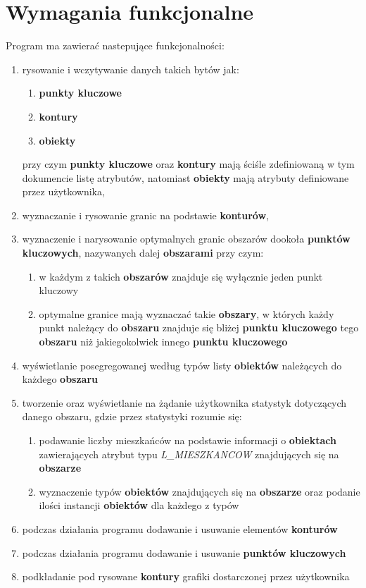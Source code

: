 \documentclass[hidelinks,10pt,a4paper]{article}
\newcommand\tab[1][0.5cm]{\hspace*{#1}}
\begin{document}
\section{Wymagania funkcjonalne}
\tab Program ma zawierać nastepujące funkcjonalności:
\begin{enumerate}


\item rysowanie i wczytywanie danych takich bytów jak:
\begin{enumerate}
\item \textbf{punkty kluczowe}
\item \textbf{kontury}
\item \textbf{obiekty}
\end{enumerate}
przy czym \textbf{punkty kluczowe} oraz \textbf{kontury} mają ściśle zdefiniowaną w tym dokumencie listę atrybutów, natomiast \textbf{obiekty} mają atrybuty definiowane przez użytkownika,
\item wyznaczanie i rysowanie granic na podstawie \textbf{konturów},
\item wyznaczenie i narysowanie optymalnych granic obszarów dookoła \textbf{punktów kluczowych}, nazywanych dalej \textbf{obszarami} przy czym:
\begin{enumerate}
\item w każdym z takich \textbf{obszarów} znajduje się wyłącznie jeden punkt kluczowy
\item optymalne granice mają wyznaczać takie \textbf{obszary}, w których każdy punkt należący do \textbf{obszaru} znajduje się bliżej \textbf{punktu kluczowego} tego \textbf{obszaru} niż jakiegokolwiek innego \textbf{punktu kluczowego}
\end{enumerate}
\item wyświetlanie posegregowanej według typów listy \textbf{obiektów} należących do każdego \textbf{obszaru}
\item tworzenie oraz wyświetlanie na żądanie użytkownika statystyk dotyczących danego obszaru, gdzie przez statystyki rozumie się:
\begin{enumerate}
\item podawanie liczby mieszkańców na podstawie informacji o \textbf{obiektach} zawierających atrybut typu \textit{L\_MIESZKANCOW} znajdujących się na \textbf{obszarze} 
\item wyznaczenie typów \textbf{obiektów} znajdujących się na \textbf{obszarze} oraz podanie ilości instancji \textbf{obiektów} dla każdego z typów
\end{enumerate}
\item podczas działania programu dodawanie i usuwanie elementów \textbf{konturów}
\item podczas działania programu dodawanie i usuwanie \textbf{punktów kluczowych} 
\item podkładanie pod rysowane \textbf{kontury} grafiki dostarczonej przez użytkownika

\end{enumerate}
\end{document}
